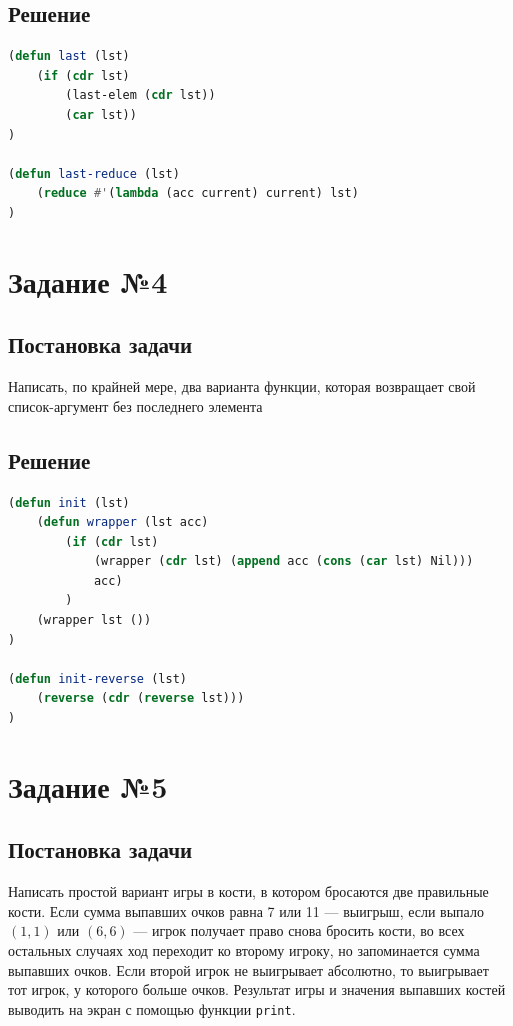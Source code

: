 \documentclass[12pt]{report}
\begin{document}
\subsection*{Решение}
\begin{lstlisting}[label=third,caption=Решение задания №3, language=lisp]
(defun last (lst)
	(if (cdr lst)
		(last-elem (cdr lst))
		(car lst))
)

(defun last-reduce (lst)
	(reduce #'(lambda (acc current) current) lst)
)
\end{lstlisting}

\section*{Задание №4}
\subsection*{Постановка задачи}
Написать, по крайней мере, два варианта функции, которая возвращает свой список-аргумент без последнего элемента

\subsection*{Решение}
\begin{lstlisting}[label=third,caption=Решение задания №3, language=lisp]
(defun init (lst)
	(defun wrapper (lst acc)
		(if (cdr lst)
			(wrapper (cdr lst) (append acc (cons (car lst) Nil)))
			acc)
		)
	(wrapper lst ())
)

(defun init-reverse (lst)
	(reverse (cdr (reverse lst)))
)
\end{lstlisting}

\section*{Задание №5}
\subsection*{Постановка задачи}
Написать простой вариант игры в кости, в котором бросаются две правильные кости. Если сумма выпавших очков равна 7 или 11 --- выигрыш, если выпало $(1, 1)$ или $(6, 6)$ --- игрок получает право снова бросить кости, во всех остальных случаях ход переходит ко второму игроку, но запоминается сумма выпавших очков. Если второй игрок не выигрывает абсолютно, то выигрывает тот игрок, у которого больше очков. Результат игры и значения выпавших костей выводить на экран с помощью функции \texttt{print}.
\end{document}
